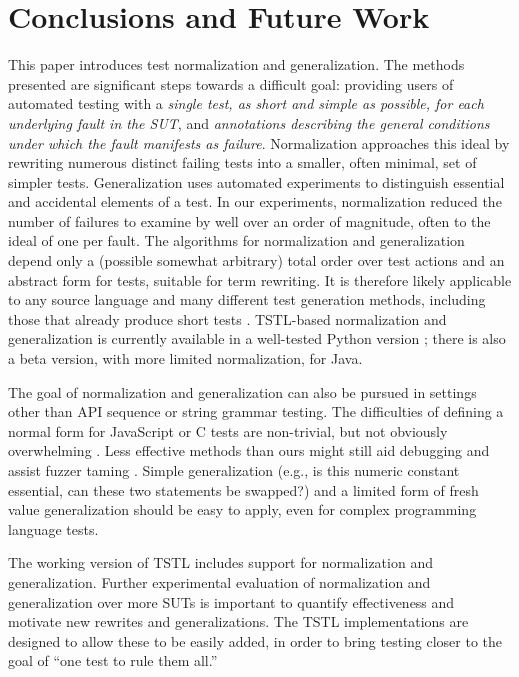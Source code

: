 \section{Conclusions and Future Work}

This paper introduces test normalization and generalization.  The
methods presented are significant steps towards a difficult goal:
providing users of automated testing with a \emph{single test, as
  short and simple as possible, for each underlying fault in the SUT},
and \emph{annotations describing the general conditions under which
  the fault manifests as failure}.  Normalization approaches this
ideal by rewriting numerous distinct failing tests into a smaller,
often minimal, set of simpler tests.  Generalization uses automated
experiments to distinguish essential and accidental elements of a
test.  In our experiments, normalization reduced the number of
failures to examine by well over an order of magnitude, often to the
ideal of one per fault.  The algorithms for normalization and
generalization depend only a (possible somewhat arbitrary) total order
over test actions and an abstract form for tests, suitable for term
rewriting.  It is therefore likely applicable to any source language
and many different test generation methods, including those that
already produce short tests \cite{FA11,SoftBET}.  TSTL-based
normalization and generalization is currently available in a
well-tested Python version \cite{tstl,ISSTA15}; there is also a beta version, with more limited
normalization, for Java.


The goal of normalization and generalization can also be pursued in
settings other than API sequence or string grammar testing.  The
difficulties of defining a normal form for JavaScript \cite{jsfunfuzz}
or C \cite{csmith} tests are non-trivial, but not obviously
overwhelming \cite{CReduce}. Less effective methods
than ours might still aid debugging and assist fuzzer taming
\cite{PLDI13}.  Simple generalization (e.g., is this numeric constant
essential, can these two statements be swapped?) and a limited form of
fresh value generalization should be easy to apply, even for complex
programming language tests.  

The working version of  TSTL \cite{tstl} includes
support for normalization and generalization.  Further experimental
evaluation of normalization and generalization over more SUTs is
important to quantify effectiveness and motivate new rewrites and
generalizations.  The TSTL implementations are designed to allow these
to be easily added, in order to bring testing closer to the
goal of ``one test to rule them all.''
